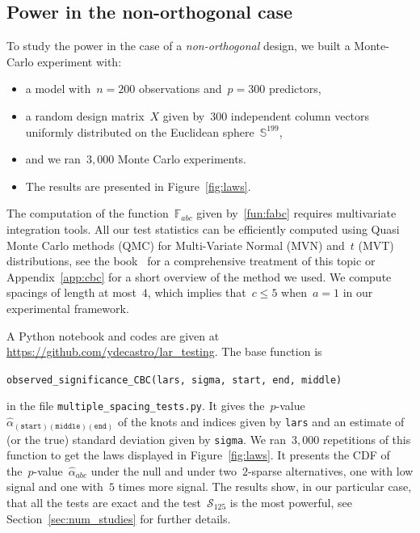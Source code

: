 \documentclass[final,numbib]{imaiai}%
\numberwithin{equation}{section}
\def\bbF{\mathds{F}}
\renewcommand{\hat}{\widehat}
\newcommand{\<}{\langle}
\renewcommand{\>}{\rangle}
\newcommand{\1}{\mathds{1}}
\begin{document}
{\subsection{Power in the non-orthogonal case}
\label{sec_power_num}
To study the power in the case of a {\it non-orthogonal} design, we built a Monte-Carlo experiment with:
\begin{itemize}
\item a model with~$n=200$ observations and~$p=300$ predictors,
\item a random design matrix~$X$ given by~$300$ independent column vectors uniformly distributed on the Euclidean sphere~$\mathds S^{199}$,
 \item and we ran~$3,000$ Monte Carlo experiments.
 \item The results are presented in Figure~\ref{fig:laws}.
\end{itemize}
The computation of the function~$\bbF_{abc}$ given by~\eqref{fun:fabc} requires multivariate integration tools. All our test statistics can be efficiently computed using Quasi Monte Carlo methods (QMC) for Multi-Variate Normal (MVN) and~$t$ (MVT) distributions, see the book~\cite{genz2009computation} for a comprehensive treatment of this topic or Appendix~\ref{app:cbc} for a short overview of the method we used. We compute spacings of length at most~$4$, which implies that~$c\leq 5$ when~$a=1$ in our experimental framework. 

A Python notebook and codes are given at \url{https://github.com/ydecastro/lar_testing}. The base function is 
\begin{center}
{\tt observed\_significance\_CBC(lars, sigma, start, end, middle)}
\end{center}
in the file {\tt multiple\_spacing\_tests.py}. It gives the~$p$-value~$\hat\alpha_{(\mathtt{start})(\mathtt{middle})(\mathtt{end})}$ of the knots and indices given by {\tt lars} and an estimate of (or the true) standard deviation given by {\tt sigma}. We ran~$3,000$ repetitions of this function to get the laws displayed in Figure~\ref{fig:laws}. It presents the CDF of the~$p$-value~$\hat \alpha_{abc}$ under the null and under two~$2$-sparse alternatives, one with low signal and one with~$5$ times more signal. The results show, in our particular case, that all the tests are exact and the test~$\mathcal S_{125}$ is the most powerful, see Section~\ref{sec:num_studies} for further details.


}
\end{document}
